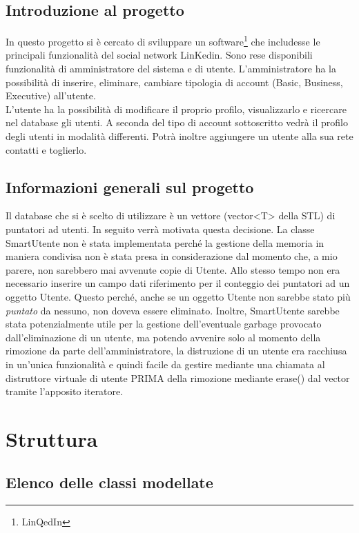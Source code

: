 \documentclass[openany, a4paper,11pt] {report}
\begin{document}
\section{Introduzione al progetto}

In questo progetto si è cercato di sviluppare un software\footnote{LinQedIn} che includesse le principali funzionalità del social network LinKedin.
Sono rese disponibili funzionalità di amministratore del sistema e di utente.
L'amministratore ha la possibilità di inserire, eliminare, cambiare tipologia di account (\textsf{Basic, Business, Executive}) all'utente.
\\
L'utente ha la possibilità di modificare il proprio profilo, visualizzarlo e ricercare nel database gli utenti. A seconda del tipo di account sottoscritto vedrà il profilo degli utenti in modalità differenti. Potrà inoltre aggiungere un utente alla sua rete contatti e toglierlo.

\section{Informazioni generali sul progetto}
Il database che si è scelto di utilizzare è un vettore (\textsf{vector<T> della STL}) di puntatori ad utenti. In seguito verrà motivata questa decisione. La classe \textsf{SmartUtente} non è stata implementata perché la gestione della memoria in maniera condivisa non è stata presa in considerazione dal momento che, a mio parere, non sarebbero mai avvenute copie di Utente. Allo stesso tempo non era necessario inserire un campo dati riferimento per il conteggio dei puntatori ad un oggetto Utente. Questo perché, anche se un oggetto Utente non sarebbe stato più \textsl{puntato} da nessuno, non doveva essere eliminato. Inoltre, SmartUtente sarebbe stata potenzialmente utile per la gestione dell'eventuale garbage provocato dall'eliminazione di un utente, ma potendo avvenire solo al momento della rimozione da parte dell'amministratore, la distruzione di un utente era racchiusa in un'unica funzionalità e quindi facile da gestire mediante una chiamata al distruttore virtuale di utente PRIMA della rimozione mediante \textsf{erase()} dal vector tramite l'apposito iteratore.


\chapter{Struttura}
\section{Elenco delle classi modellate}
\end{document}
